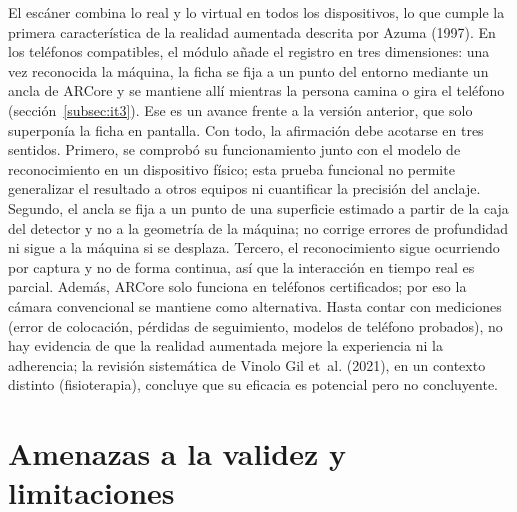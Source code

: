 El escáner combina lo real y lo virtual en todos los dispositivos, lo que
cumple la primera característica de la realidad aumentada descrita por Azuma
(1997). En los teléfonos compatibles, el módulo  añade el
registro en tres dimensiones: una vez reconocida la máquina, la ficha se fija a
un punto del entorno mediante un ancla de ARCore y se mantiene allí mientras la
persona camina o gira el teléfono (sección~\ref{subsec:it3}). Ese es un avance
frente a la versión anterior, que solo superponía la ficha en pantalla. Con todo,
la afirmación debe acotarse en tres sentidos. Primero, se comprobó su funcionamiento junto con el modelo de reconocimiento
en un dispositivo físico; esta prueba funcional no permite generalizar el
resultado a otros equipos ni cuantificar la precisión del anclaje.
Segundo, el ancla se fija a un punto de una superficie estimado a partir de la
caja del detector y no a la geometría de la máquina; no corrige errores de
profundidad ni sigue a la máquina si se desplaza. Tercero, el reconocimiento
sigue ocurriendo por captura y no de forma continua, así que la interacción en
tiempo real es parcial. Además, ARCore solo funciona en teléfonos certificados;
por eso la cámara convencional se mantiene como alternativa. Hasta contar con
mediciones (error de colocación, pérdidas de seguimiento, modelos de teléfono
probados), no hay evidencia de que la realidad aumentada mejore la experiencia
ni la adherencia; la revisión sistemática de Vinolo Gil et~al. (2021), en un
contexto distinto (fisioterapia), concluye que su eficacia es potencial pero no
concluyente.

\section{Amenazas a la validez y limitaciones}
\label{sec:amenazas}

